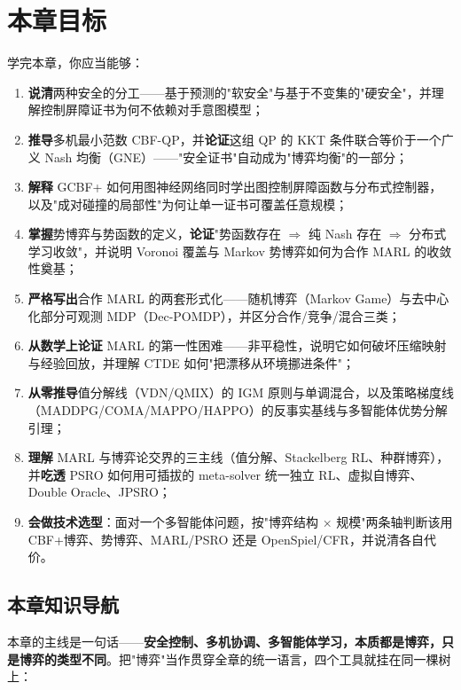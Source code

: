 \section*{本章目标}
学完本章，你应当能够：
\begin{enumerate}
  \item \textbf{说清}两种安全的分工——基于预测的"软安全"与基于不变集的"硬安全"，并理解控制屏障证书为何不依赖对手意图模型；
  \item \textbf{推导}多机最小范数 CBF-QP，并\textbf{论证}这组 QP 的 KKT 条件联合等价于一个广义 Nash 均衡（GNE）——"安全证书"自动成为"博弈均衡"的一部分；
  \item \textbf{解释} GCBF+ 如何用图神经网络同时学出图控制屏障函数与分布式控制器，以及"成对碰撞的局部性"为何让单一证书可覆盖任意规模；
  \item \textbf{掌握}势博弈与势函数的定义，\textbf{论证}"势函数存在 $\Rightarrow$ 纯 Nash 存在 $\Rightarrow$ 分布式学习收敛"，并说明 Voronoi 覆盖与 Markov 势博弈如何为合作 MARL 的收敛性奠基；
  \item \textbf{严格写出}合作 MARL 的两套形式化——随机博弈（Markov Game）与去中心化部分可观测 MDP（Dec-POMDP），并区分合作/竞争/混合三类；
  \item \textbf{从数学上论证} MARL 的第一性困难——非平稳性，说明它如何破坏压缩映射与经验回放，并理解 CTDE 如何"把漂移从环境挪进条件"；
  \item \textbf{从零推导}值分解线（VDN/QMIX）的 IGM 原则与单调混合，以及策略梯度线（MADDPG/COMA/MAPPO/HAPPO）的反事实基线与多智能体优势分解引理；
  \item \textbf{理解} MARL 与博弈论交界的三主线（值分解、Stackelberg RL、种群博弈），并\textbf{吃透} PSRO 如何用可插拔的 meta-solver 统一独立 RL、虚拟自博弈、Double Oracle、JPSRO；
  \item \textbf{会做技术选型}：面对一个多智能体问题，按"博弈结构 $\times$ 规模"两条轴判断该用 CBF+博弈、势博弈、MARL/PSRO 还是 OpenSpiel/CFR，并说清各自代价。
\end{enumerate}

\subsection*{本章知识导航}
本章的主线是一句话——\textbf{安全控制、多机协调、多智能体学习，本质都是博弈，只是博弈的类型不同}。把"博弈"当作贯穿全章的统一语言，四个工具就挂在同一棵树上：

